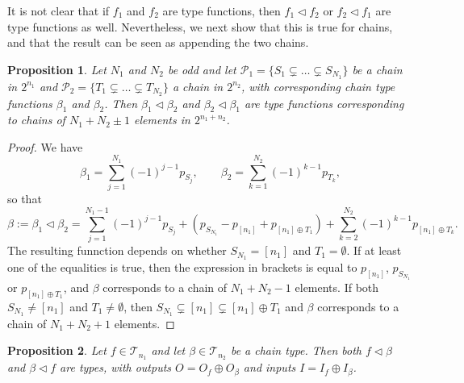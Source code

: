 \documentclass[12pt]{article}
\newtheorem{prop}{Proposition}
\theoremstyle{definition}
\theoremstyle{remark}
\def\Te{\mathcal T}
\def\Pe{\mathcal P}
\def\vtl{\vartriangleleft}
\begin{document}
It is not clear that if $f_1$ and $f_2$ are type functions, then $f_1\vtl f_2$ or $f_2\vtl
f_1$ are type functions as well. Nevertheless, we next show that this is true for chains,
and that the result can be seen as appending the two chains.



\begin{prop}\label{prop:append_chains} Let $N_1$ and $N_2$ be odd and let 
$\Pe_1=\{S_1\subsetneq \dots\subsetneq S_{N_1}\}$ be a chain in  $2^{n_1}$ and
$\Pe_2=\{T_1\subsetneq \dots \subsetneq T_{N_2}\}$ a chain in $2^{n_2}$, 
 with corresponding chain type functions $\beta_1$ and $\beta_2$. Then 
$\beta_1\vtl \beta_2$ and $\beta_2\vtl \beta_1$ are  type functions corresponding to
chains of $N_1+N_2\pm 1$
elements in $2^{n_1+n_2}$.

\end{prop}

\begin{proof} We have
\[
\beta_1=\sum_{j=1}^{N_1}(-1)^{j-1}p_{S_j},\qquad \beta_2=\sum_{k=1}^{N_2}(-1)^{k-1}p_{T_k},
\]
so that
\[
\beta:=\beta_1\vtl\beta_2=\sum_{j=1}^{N_1-1}(-1)^{j-1}p_{S_j}+(p_{S_{N_1}}-p_{[n_1]}+p_{[n_1]\oplus
T_1})+\sum_{k=2}^{N_2}(-1)^{k-1}p_{[n_1]\oplus T_k}.
\]
The resulting funnction depends on whether  $S_{N_1}=[n_1]$ and $T_1=\emptyset$. If at least one
of the equalities is true, then the expression in brackets is equal to $p_{[n_1]}$,
$p_{S_{N_1}}$ or $p_{[n_1]\oplus T_1}$,  and $\beta$ corresponds to
a chain of $N_1+N_2-1$ elements. If both $S_{N_1}\ne [n_1]$ and $T_1\ne \emptyset$, then
$S_{N_1}\subsetneq [n_1]\subsetneq [n_1]\oplus T_1$ and $\beta$ corresponds to a chain of
$N_1+N_2+1$ elements.



\end{proof}




\begin{prop}\label{prop:append_chain_f}  Let $f\in \Te_{n_1}$ and let $\beta\in \Te_{n_2}$
be a chain type. Then both $f\vtl \beta$ and $\beta\vtl f$ are types, with outputs
$O=O_f\oplus O_\beta$ and inputs $I=I_f\oplus I_\beta$. 

\end{prop}
\end{document}
